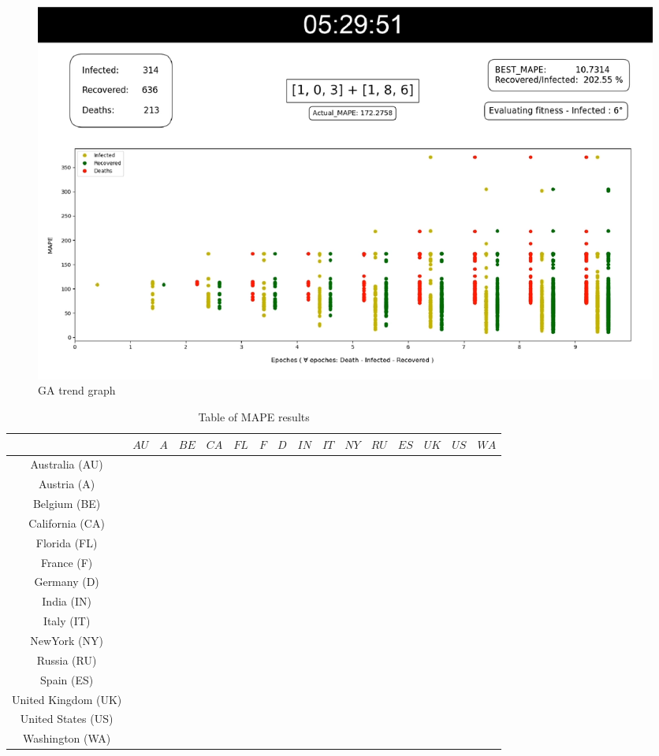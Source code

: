 \documentclass[letterpaper]{article}%
\begin{document}
\clearpage 
\onecolumn
\begin{figure}[!h]
	\includegraphics[width=\columnwidth]{img/GA_algorithm_iter10-resize}
	\caption{GA trend graph}
	\label{fig:GAgraph}
\end{figure}

\setlength\extrarowheight{5pt}
\begin{table}[!h]
	\caption{Table of MAPE results }
	\label{result}
	\begin{tabular}{cccccccccccccccc}
		   &$AU$&$A$&$BE$&$CA$&$FL$&$F$&$D$&$IN$&$IT$&$NY$&$RU$&$ES$&$UK$&$US$&$WA$\\
	\hline
		Australia (AU) &  &  &  &  &  &  &  &  &  &  &  &  &  & \\\hline
		Austria (A) &  &  &  &  &  &  &  &  &  &  &  &  &  & \\\hline
		Belgium (BE) &  &  &  &  &  &  &  &  &  &  &  &  &  & \\\hline
		California (CA) &  &  &  &  &  &  &  &  &  &  &  &  &  & \\\hline
		Florida (FL) &  &  &  &  &  &  &  &  &  &  &  &  &  & \\\hline
		France (F) &  &  &  &  &  &  &  &  &  &  &  &  &  & \\\hline
		Germany (D) &  &  &  &  &  &  &  &  &  &  &  &  &  & \\\hline
		India (IN) &  &  &  &  &  &  &  &  &  &  &  &  &  & \\\hline
		Italy (IT) &  &  &  &  &  &  &  &  &  &  &  &  &  & \\\hline
		NewYork (NY) &  &  &  &  &  &  &  &  &  &  &  &  &  & \\\hline
		Russia (RU) &  &  &  &  &  &  &  &  &  &  &  &  &  & \\\hline
		Spain (ES) &  &  &  &  &  &  &  &  &  &  &  &  &  & \\\hline
		United Kingdom (UK) &  &  &  &  &  &  &  &  &  &  &  &  &  & \\\hline
		United States (US) &  &  &  &  &  &  &  &  &  &  &  &  &  & \\\hline
		Washington (WA) &  &  &  &  &  &  &  &  &  &  &  &  &  & \\\hline
	\end{tabular}

	\label{tab:params}
\end{table}
\clearpage
\twocolumn
\end{document}
